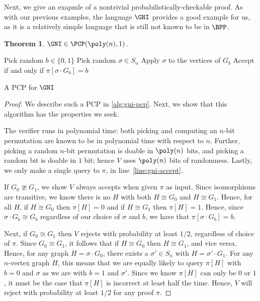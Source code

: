 \documentclass[english,12pt]{reedthesis}
\theoremstyle{plain}
\newtheorem{thm}{Theorem}[section]
\theoremstyle{definition}
\theoremstyle{remark}
\begin{document}
Next, we give an exapmle of a nontrivial probabilistically-checkable proof. As
with our previous examples, the language $\GNI$ provides a good example for us,
as it is a relatively simple language that is still not known to be in $\BPP$.

\begin{thm}\label{thm:gni-pcp}
  $\GNI \in \PCP(\poly(n), 1)$.
\end{thm}

\begin{algorithm}[htbp]
  \KwRet{$\pi$}\;
  Pick random $b \in \{0, 1\}$\;
  Pick random $\sigma \in S_{n}$\;
  Apply $\sigma$ to the vertices of $G_{b}$\;
  Accept if and only if $\pi[\sigma \cdot G_{b}] = b$\;
  \caption{A PCP for $\GNI$}\label{alg:gni-pcp}
\end{algorithm}

\begin{proof} %
  We describe such a PCP in \cref{alg:gni-pcp}. Next, we show that this
  algorithm has the properties we seek.

  The verifier runs in polynomial time: both picking and computing an $n$-bit
  permutation are known to be in polynomial time with respect to $n$. Further,
  picking a random $n$-bit permutation is doable in $\poly(n)$ bits, and picking
  a random bit is doable in $1$ bit; hence $V$ uses $\poly(n)$ bits of
  randomness. Lastly, we only make a single query to $\pi$, in
  line~\ref{line:gni-accept}.

  If $G_{0} \ncong G_{1}$, we show $V$ always accepts when given $\pi$ as input. Since
  isomorphisms are transitive, we know there is no $H$ with both $H \cong G_{0}$ and
  $H \cong G_{1}$. Hence, for all $H$, if $H \cong G_{0}$ then $\pi[H] = 0$ and if
  $H \cong G_{1}$ then $\pi[H] = 1$. Hence, since $\sigma \cdot G_{b} \cong G_{b}$ regardless of
  our choice of $\sigma$ and $b$, we have that $\pi[\sigma \cdot G_{b}] = b$.

  Next, if $G_{0} \cong G_{1}$ then $V$ rejects with probability at least $1/2$,
  regardless of choice of $\pi$. Since $G_{0} \cong G_{1}$, it follows that if
  $H \cong G_{0}$ then $H \cong G_{1}$, and vice versa. Hence, for any graph
  $H = \sigma \cdot G_{0}$, there exists a $\sigma' \in S_{n}$ with $H = \sigma' \cdot G_{1}$. For any
  $n$-vertex graph $H$, this means that we are equally likely to query $\pi[H]$
  with $b = 0$ and $\sigma$ as we are with $b = 1$ and $\sigma'$. Since we know $\pi[H]$ can
  only be $0$ or $1$, it must be the case that $\pi[H]$ is incorrect at least half
  the time. Hence, $V$ will reject with probability at least $1/2$ for any proof
  $\pi$.
\end{proof}
\end{document}
